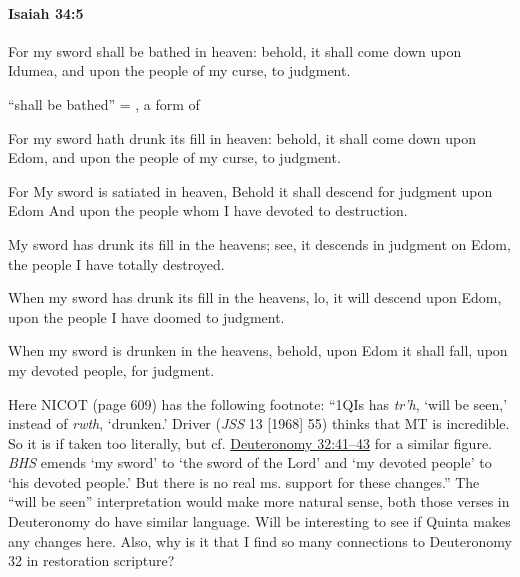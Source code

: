 		\paragraph{Isaiah 34:5} %
			\label{ISAIAH-34-5}

			For my sword shall be bathed in heaven: behold, it shall come down upon Idumea, and upon the people of my curse, to judgment.

			\begin{framed}
			\scriptsize
				\begin{compactdesc}
					\item[BHS]  ``shall be bathed'' = , a form of 
					\item[LXX] 
					\item[ASV] For my sword hath drunk its fill in heaven: behold, it shall come down upon Edom, and upon the people of my curse, to judgment.
					\item[NASB] For My sword is satiated in heaven, Behold it shall descend for judgment upon Edom And upon the people whom I have devoted to destruction.
					\item[NIV] My sword has drunk its fill in the heavens; see, it descends in judgment on Edom, the people I have totally destroyed.
					\item[NRSV] When my sword has drunk its fill in the heavens, lo, it will descend upon Edom, upon the people I have doomed to judgment.
					\item[NICOT] When my sword is drunken in the heavens, behold, upon Edom it shall fall, upon my devoted people, for judgment.
						\begin{compactenum}
							\item Here NICOT (page 609) has the following footnote: ``1QIs has \textit{tr'h}, `will be seen,' instead of \textit{rwth}, `drunken.' Driver (\textit{JSS} 13 [1968] 55) thinks that MT is incredible. So it is if taken too literally, but cf. \hyperref[DEUTERONOMY-32-41]{Deuteronomy 32:41--43} for a similar figure. \textit{BHS} emends `my sword' to `the sword of the Lord' and `my devoted people' to `his devoted people.' But there is no real ms. support for these changes.'' The ``will be seen'' interpretation would make more natural sense, both those verses in Deuteronomy do have similar language. Will be interesting to see if Quinta makes any changes here. Also, why is it that I find so many connections to Deuteronomy 32 in restoration scripture?

\end{compactenum}
\end{compactdesc}
\end{framed}
